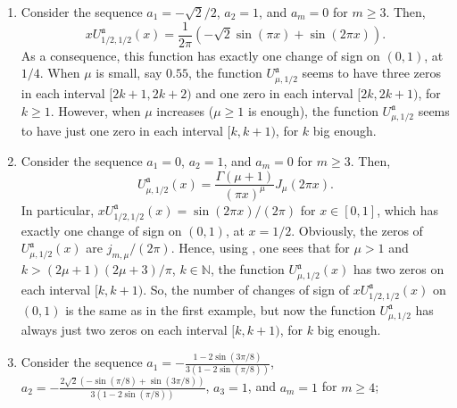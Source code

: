\documentclass[10pt,a4paper]{article}
\numberwithin{equation}{section}
\theoremstyle{plain}
\theoremstyle{definition}
\newcommand{\aA}{\mathfrak{a}}
\newcommand{\NN}{\mathbb{N}}
\begin{document}
\begin{enumerate}
\item Consider the sequence
$a_1 =-\sqrt 2/2$, $a_2=1$, and $a_m=0$ for $m\ge 3$.
Then,
\[
   xU_{1/2,1/2}^{\aA}(x)=\frac{1}{2\pi}(-\sqrt 2\sin(\pi x)+\sin(2\pi x)).
\]
As a consequence, this function has exactly one change of sign on $(0,1)$, at $1/4$.
When $\mu$ is small, say $0.55$, the function
$U_{\mu,1/2}^{\aA}$ seems to have three zeros in each interval $[2k+1,2k+2)$ and one zero in each interval $[2k,2k+1)$, for $k\ge 1$. However, when $\mu$ increases ($\mu\ge 1$ is enough), the function $U_{\mu,1/2}^{\aA}$ seems to have just one zero in each interval $[k,k+1)$, for $k$ big enough.

\item Consider the sequence
$a_1=0$, $a_2 =1$, and $a_m=0$ for $m\ge 3$.
Then,
\[
   U_{\mu,1/2}^{\aA}(x) = \frac{\Gamma(\mu+1)}{(\pi x)^\mu}J_\mu (2\pi x).
\]
In particular, $xU_{1/2,1/2}^{\aA}(x)=\sin(2\pi x)/(2\pi)$ for $x\in[0,1]$,
which has exactly one change of sign on $(0,1)$, at $x = 1/2$.
Obviously, the zeros of $U_{\mu,1/2}^{\aA}(x)$
are $j_{m,\mu}/(2\pi)$. Hence, using \cite[\S\,15.35, p.~492]{Wat}, one sees that for $\mu >1$ and $k>(2\mu+1)(2\mu+3)/\pi$, $k\in \NN$, the function $U_{\mu,1/2}^{\aA}(x)$ has two zeros on each interval $[k,k+1)$. So, the number of changes of sign of $xU_{1/2,1/2}^{\aA}(x)$
on $(0,1)$ is the same as in the first example, but now the function $U_{\mu,1/2}^{\aA}$ has always just two zeros on each interval $[k,k+1)$, for $k$ big enough.
\item Consider the sequence
$a_1 = -\frac{1-2\sin(3\pi/8)}{3(1-2\sin(\pi/8))}$,
$a_2 = -\frac{2\sqrt 2(-\sin(\pi/8)+\sin(3\pi/8))}{3(1-2\sin(\pi/8))}$,
$a_3 = 1$, and $a_m = 1$ for $m\ge 4$;

\end{enumerate}
\end{document}
